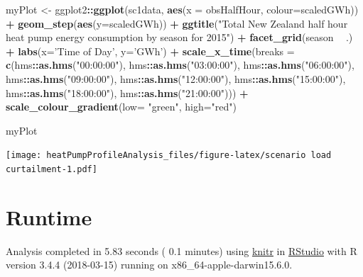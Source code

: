 \documentclass[]{article}
\newenvironment{Shaded}{\begin{snugshade}}{\end{snugshade}}
\newcommand{\KeywordTok}[1]{\textcolor[rgb]{0.13,0.29,0.53}{\textbf{#1}}}
\newcommand{\DataTypeTok}[1]{\textcolor[rgb]{0.13,0.29,0.53}{#1}}
\newcommand{\StringTok}[1]{\textcolor[rgb]{0.31,0.60,0.02}{#1}}
\newcommand{\OperatorTok}[1]{\textcolor[rgb]{0.81,0.36,0.00}{\textbf{#1}}}
\newcommand{\NormalTok}[1]{#1}
\begin{document}
\begin{Shaded}
\begin{Highlighting}[]
\NormalTok{myPlot <-}\StringTok{ }\NormalTok{ggplot2}\OperatorTok{::}\KeywordTok{ggplot}\NormalTok{(sc1data, }\KeywordTok{aes}\NormalTok{(}\DataTypeTok{x =}\NormalTok{ obsHalfHour, }\DataTypeTok{colour=}\NormalTok{scaledGWh)) }\OperatorTok{+}
\StringTok{  }\KeywordTok{geom_step}\NormalTok{(}\KeywordTok{aes}\NormalTok{(}\DataTypeTok{y=}\NormalTok{scaledGWh)) }\OperatorTok{+}
\StringTok{  }\KeywordTok{ggtitle}\NormalTok{(}\StringTok{"Total New Zealand half hour heat pump energy consumption by season for 2015"}\NormalTok{) }\OperatorTok{+}
\StringTok{  }\KeywordTok{facet_grid}\NormalTok{(season }\OperatorTok{~}\StringTok{ }\NormalTok{.) }\OperatorTok{+}
\StringTok{  }\KeywordTok{labs}\NormalTok{(}\DataTypeTok{x=}\StringTok{'Time of Day'}\NormalTok{, }\DataTypeTok{y=}\StringTok{'GWh'}\NormalTok{) }\OperatorTok{+}
\StringTok{  }\KeywordTok{scale_x_time}\NormalTok{(}\DataTypeTok{breaks =} \KeywordTok{c}\NormalTok{(hms}\OperatorTok{::}\KeywordTok{as.hms}\NormalTok{(}\StringTok{"00:00:00"}\NormalTok{), hms}\OperatorTok{::}\KeywordTok{as.hms}\NormalTok{(}\StringTok{"03:00:00"}\NormalTok{), hms}\OperatorTok{::}\KeywordTok{as.hms}\NormalTok{(}\StringTok{"06:00:00"}\NormalTok{), hms}\OperatorTok{::}\KeywordTok{as.hms}\NormalTok{(}\StringTok{"09:00:00"}\NormalTok{), hms}\OperatorTok{::}\KeywordTok{as.hms}\NormalTok{(}\StringTok{"12:00:00"}\NormalTok{), }
\NormalTok{                          hms}\OperatorTok{::}\KeywordTok{as.hms}\NormalTok{(}\StringTok{"15:00:00"}\NormalTok{), hms}\OperatorTok{::}\KeywordTok{as.hms}\NormalTok{(}\StringTok{"18:00:00"}\NormalTok{), hms}\OperatorTok{::}\KeywordTok{as.hms}\NormalTok{(}\StringTok{"21:00:00"}\NormalTok{))) }\OperatorTok{+}
\KeywordTok{scale_colour_gradient}\NormalTok{(}\DataTypeTok{low=} \StringTok{"green"}\NormalTok{, }\DataTypeTok{high=}\StringTok{"red"}\NormalTok{)}

\NormalTok{myPlot}
\end{Highlighting}
\end{Shaded}

\texttt{[image: heatPumpProfileAnalysis\_files/figure-latex/scenario load curtailment-1.pdf]}

\section{Runtime}\label{runtime}

Analysis completed in 5.83 seconds ( 0.1 minutes) using
\href{https://cran.r-project.org/package=knitr}{knitr} in
\href{http://www.rstudio.com}{RStudio} with R version 3.4.4 (2018-03-15)
running on x86\_64-apple-darwin15.6.0.
\end{document}
